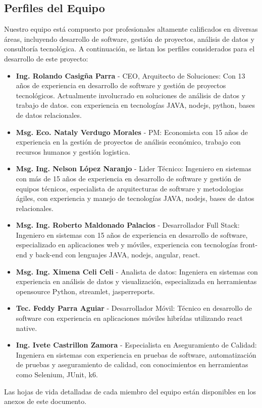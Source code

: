 \subsection{Perfiles del Equipo}
Nuestro equipo está compuesto por profesionales altamente calificados en diversas áreas, incluyendo desarrollo de software, gestión de proyectos, análisis de datos y consultoría tecnológica. A continuación, se listan los perfiles considerados para el desarrollo de este proyecto:
\begin{itemize}
        \item \textbf{Ing. Rolando Casigña Parra} - CEO, Arquitecto de Soluciones: Con 13 años de experiencia en desarrollo de software y gestión de proyectos tecnológicos. Actualmente involucrado en soluciones de análisis de datos y trabajo de datos. con experiencia en tecnologías JAVA, nodejs, python, bases de datos relacionales.
        \item \textbf{Msg. Eco. Nataly Verdugo Morales} - PM: Economista con 15 años de experiencia en la gestión de proyectos de análisis económico, trabajo con recursos humanos y gestión logistica.
        \item \textbf{Msg. Ing. Nelson López Naranjo} - Lider Técnico: Ingeniero en sistemas con más de 15 años de experiencia en desarrollo de software y gestión de equipos técnicos, especialista de arquitecturas de software y metodologias ágiles, con experiencia y manejo de tecnologías JAVA, nodejs, bases de datos relacionales.
        \item \textbf{Msg. Ing. Roberto Maldonado Palacios} - Desarrollador Full Stack: Ingeniero en sistemas con 15 años de experiencia en desarrollo de software, especializado en aplicaciones web y móviles, experiencia con tecnologías front-end y back-end con lenguajes JAVA, nodejs, angular, react.
        \item \textbf{Msg. Ing. Ximena Celi Celi} - Analista de datos: Ingeniera en sistemas con experiencia en análisis de datos y visualización, especializada en herramientas opensource Python, streamlet, jasperreports.
        \item  \textbf{Tec. Feddy Parra Aguiar} - Desarrollador Móvil: Técnico en desarrollo de software con experiencia en aplicaciones móviles hibrídas utilizando react native.
        \item  \textbf{Ing. Ivete Castrillon Zamora} - Especialista en Aseguramiento de Calidad: Ingeniera en sistemas con experiencia en pruebas de software, automatización de pruebas y aseguramiento de calidad, con conocimientos en herramientas como Selenium, JUnit, k6.
\end{itemize}
Las hojas de vida detalladas de cada miembro del equipo están disponibles en los anexos de este documento.